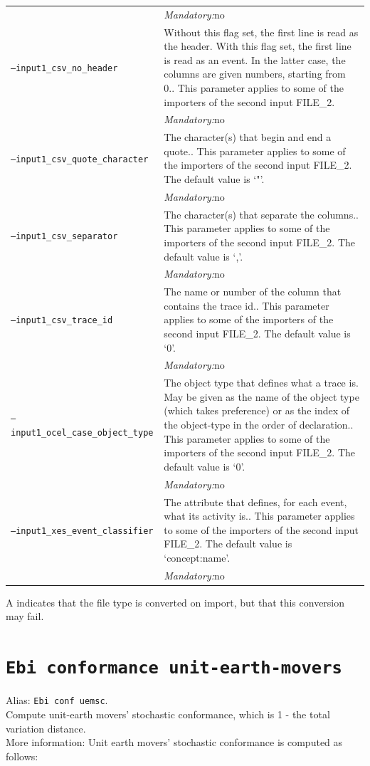 {\begin{tabularx}{\linewidth}{lX}
&\textit{Mandatory:}\quad no\\
\texttt{--input1\_csv\_no\_header} & Without this flag set, the first line is read as the header. 
    With this flag set, the first line is read as an event. In the latter case, the columns are given numbers, starting from 0.. This parameter applies to some of the importers of the second input FILE\_2. \\
&\textit{Mandatory:}\quad no\\
\texttt{--input1\_csv\_quote\_character} & The character(s) that begin and end a quote.. This parameter applies to some of the importers of the second input FILE\_2. The default value is `"'.\\
&\textit{Mandatory:}\quad no\\
\texttt{--input1\_csv\_separator} & The character(s) that separate the columns.. This parameter applies to some of the importers of the second input FILE\_2. The default value is `,'.\\
&\textit{Mandatory:}\quad no\\
\texttt{--input1\_csv\_trace\_id} & The name or number of the column that contains the trace id.. This parameter applies to some of the importers of the second input FILE\_2. The default value is `0'.\\
&\textit{Mandatory:}\quad no\\
\texttt{--input1\_ocel\_case\_object\_type} & The object type that defines what a trace is. May be given as the name of the object type (which takes preference) or as the index of the object-type in the order of declaration.. This parameter applies to some of the importers of the second input FILE\_2. The default value is `0'.\\
&\textit{Mandatory:}\quad no\\
\texttt{--input1\_xes\_event\_classifier} & The attribute that defines, for each event, what its activity is.. This parameter applies to some of the importers of the second input FILE\_2. The default value is `concept:name'.\\
&\textit{Mandatory:}\quad no\\
\bottomrule
\end{tabularx}
A \textdagger{} indicates that the file type is converted on import, but that this conversion may fail.
\clearpage\section{\texttt{Ebi conformance unit-earth-movers}}
\label{command:Ebi conformance unit-earth-movers}
Alias: \texttt{Ebi conf uemsc}.\\
Compute unit-earth movers' stochastic conformance, which is 1 - the total variation distance.\\
More information: Unit earth movers' stochastic conformance is computed as follows:
        
}
